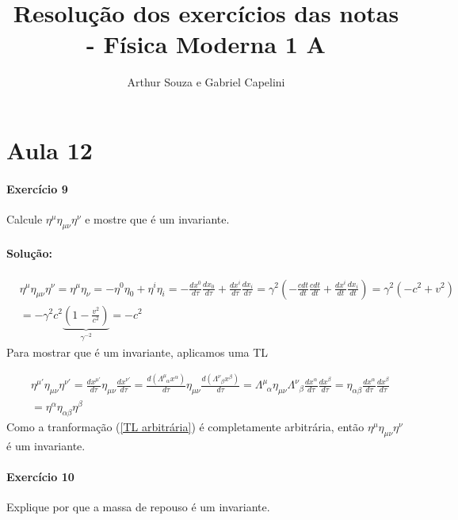 \documentclass[10pt,a4paper]{article}
\title{Resolução dos exercícios das notas - Física Moderna 1 A}
\author{Arthur Souza e Gabriel Capelini}
\begin{document}
\maketitle

\section*{Aula 12}

\paragraph{Exercício 9} Calcule $\eta^{\mu}\eta_{\mu \nu}\eta^{\nu}$ e mostre que é um invariante.

\paragraph{Solução:} 
\begin{equation}\label{norma quadrivelocidade}
\begin{split}
&\eta^{\mu}\eta_{\mu \nu}\eta^{\nu} = \eta^{\mu}\eta_{\nu} = -\eta^0 \eta_0 + \eta^i \eta_i = -\frac{dx^0}{d\tau}\frac{dx_0}{d\tau} + \frac{dx^i}{d\tau}\frac{dx_i}{d\tau} = \gamma^2 \left(-\frac{cdt}{dt}\frac{cdt}{dt} + \frac{dx^i}{dt}\frac{dx_i}{dt}\right) = \gamma^2(-c^2+v^2)\\
& = -\gamma^2 c^2\underbrace{\left(1 - \frac{v^2}{c^2}\right)}_{\gamma^{-2}} = -c^2
\end{split}
\end{equation}
Para mostrar que é um invariante, aplicamos uma TL


\begin{equation}\label{TL arbitrária}
\begin{split}
&\eta^{\mu'}\eta_{\mu \nu}\eta^{\nu'} = \frac{dx^{\mu'}}{d\tau}\eta_{\mu \nu}\frac{dx^{\nu'}}{d\tau} = \frac{d(\Lambda^{\mu}_{\;\;\alpha}x^{\alpha})}{d\tau}\eta_{\mu \nu}\frac{d(\Lambda^{\nu}_{\;\;\beta}x^{\beta})}{d\tau} = \Lambda^{\mu}_{\;\;\alpha}\eta_{\mu \nu}\Lambda^{\nu}_{\;\;\beta}\frac{dx^{\alpha}}{d\tau}\frac{dx^{\beta}}{d\tau} = \eta_{\alpha \beta}\frac{dx^{\alpha}}{d\tau}\frac{dx^{\beta}}{d\tau}\\
& = \eta^{\alpha}\eta_{\alpha \beta}\eta^{\beta}
\end{split} 
\end{equation}
Como a tranformação (\ref{TL arbitrária}) é completamente arbitrária, então $\eta^{\mu}\eta_{\mu \nu}\eta^{\nu}$ é um invariante.


\paragraph{Exercício 10} Explique por que a massa de repouso é um invariante.
\end{document}
